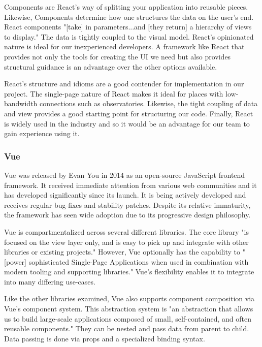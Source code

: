 \documentclass[12pt]{report}
\begin{document}
Components are React's way of splitting your application into reusable pieces. Likewise, Components determine how one structures the data on the user's end. React components "[take] in parameters...and [they return] a hierarchy of views to display."\cite{reacttutorial} The data is tightly coupled to the visual model. React's opinionated nature is ideal for our inexperienced developers. A framework like React that provides not only the tools for creating the UI we need but also provides structural guidance is an advantage over the other options available.

React's structure and idioms are a good contender for implementation in our project. The single-page nature of React makes it ideal for places with low-bandwidth connections such as observatories. Likewise, the tight coupling of data and view provides a good starting point for structuring our code. Finally, React is widely used in the industry and so it would be an advantage for our team to gain experience using it.

\subsubsection*{Vue}

Vue was released by Evan You in 2014 as an open-source JavaScript frontend framework.\cite{vuelaunch} It received immediate attention from various web communities and it has developed significantly since its launch. It is being actively developed and receives regular bug-fixes and stability patches. Despite its relative immaturity, the framework has seen wide adoption due to its progressive design philosophy.

Vue is compartmentalized across several different libraries. The core library "is focused on the view layer only, and is easy to pick up and integrate with other libraries or existing projects." \cite{vueguide} However, Vue optionally has the capability to "[power] sophisticated Single-Page Applications when used in combination with modern tooling and supporting libraries."\cite{vueguide} Vue's flexibility enables it to integrate into many differing use-cases.

Like the other libraries examined, Vue also supports component composition via Vue's component system. This abstraction system is "an abstraction that allows us to build large-scale applications composed of small, self-contained, and often reusable components."\cite{vueguide} They can be nested and pass data from parent to child. Data passing is done via props and a specialized binding syntax.
\end{document}
